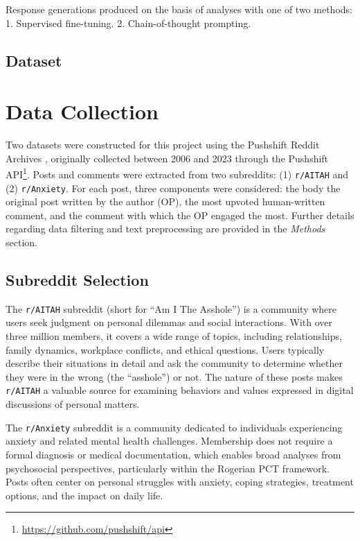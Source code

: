 \textcolor{black!60}{Response generations produced on the basis of analyses with one of two methods: 1. Supervised fine-tuning.
2. Chain-of-thought prompting.}
\textcolor{black!30}{\lipsum[9-10]}

\subsection{Dataset}
\section{Data Collection}

Two datasets were constructed for this project using the Pushshift Reddit Archives \cite{pushshift}, originally collected between 2006 and 2023 through the Pushshift API\footnote{\url{https://github.com/pushshift/api}}. Posts and comments were extracted from two subreddits: (1) \texttt{r/AITAH} and (2) \texttt{r/Anxiety}. For each post, three components were considered: the body the original post written by the author (OP), the most upvoted human-written comment, and the comment with which the OP engaged the most. Further details regarding data filtering and text preprocessing are provided in the \emph{Methods} section.  

\subsection{Subreddit Selection}

The \texttt{r/AITAH} subreddit (short for ``Am I The Asshole'') is a community where users seek judgment on personal dilemmas and social interactions. With over three million members, it covers a wide range of topics, including relationships, family dynamics, workplace conflicts, and ethical questions. Users typically describe their situations in detail and ask the community to determine whether they were in the wrong (the ``asshole'') or not. The nature of these posts makes \texttt{r/AITAH} a valuable source for examining behaviors and values expressed in digital discussions of personal matters.  

The \texttt{r/Anxiety} subreddit is a community dedicated to individuals experiencing anxiety and related mental health challenges. Membership does not require a formal diagnosis or medical documentation, which enables broad analyses from psychosocial perspectives, particularly within the Rogerian PCT framework. Posts often center on personal struggles with anxiety, coping strategies, treatment options, and the impact on daily life.


